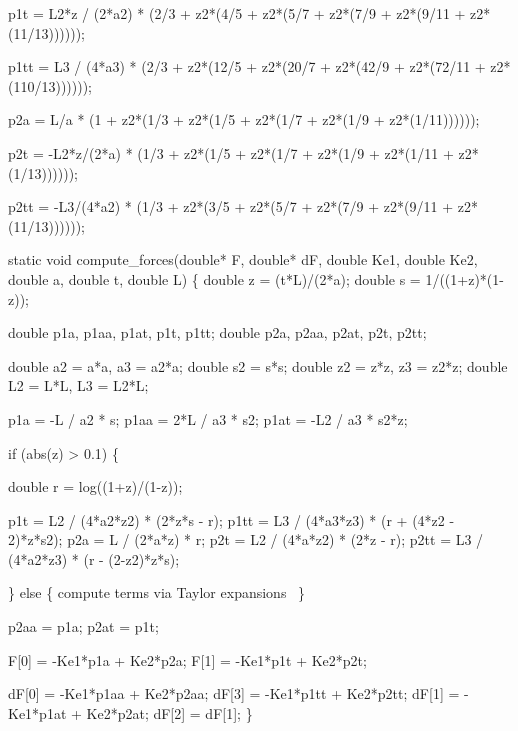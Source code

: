 p1t = L2*z / (2*a2) *
(2/3 + z2*(4/5 + z2*(5/7 + z2*(7/9 + z2*(9/11 + z2*(11/13))))));

p1tt = L3 / (4*a3) *
(2/3 + z2*(12/5 + z2*(20/7 + z2*(42/9 + z2*(72/11 + z2*(110/13))))));

p2a = L/a *
(1 + z2*(1/3 + z2*(1/5 + z2*(1/7 + z2*(1/9 + z2*(1/11))))));

p2t = -L2*z/(2*a) * 
(1/3 + z2*(1/5 + z2*(1/7 + z2*(1/9 + z2*(1/11 + z2*(1/13))))));

p2tt = -L3/(4*a2) *
(1/3 + z2*(3/5 + z2*(5/7 + z2*(7/9 + z2*(9/11 + z2*(11/13))))));

\nwendcode{}\nwdocspar

\nwenddocs{}\endmoddef
static void compute_forces(double* F, double* dF,
                           double Ke1, double Ke2, 
                           double a, double t, double L)
\{
    double z = (t*L)/(2*a);
    double s = 1/((1+z)*(1-z));

    double p1a, p1aa, p1at, p1t, p1tt;
    double p2a, p2aa, p2at, p2t, p2tt;

    double a2 = a*a, a3 = a2*a;
    double s2 = s*s;
    double z2 = z*z, z3 = z2*z;
    double L2 = L*L, L3 = L2*L;

    p1a  =   -L  / a2 * s;
    p1aa =  2*L  / a3 * s2;
    p1at =   -L2 / a3 * s2*z;

    if (abs(z) > 0.1) \{

        double r = log((1+z)/(1-z));

        p1t  =  L2 / (4*a2*z2) * (2*z*s - r);
        p1tt =  L3 / (4*a3*z3) * (r + (4*z2 - 2)*z*s2);
        p2a  =   L / (2*a*z) * r;
        p2t  =  L2 / (4*a*z2) * (2*z - r);
        p2tt =  L3 / (4*a2*z3) * (r - (2-z2)*z*s);

    \} else \{
        \LA{}compute terms via Taylor expansions~{\nwtagstyle{}}\RA{}
    \}

    p2aa = p1a;
    p2at = p1t;

    F[0]  = -Ke1*p1a  + Ke2*p2a;
    F[1]  = -Ke1*p1t  + Ke2*p2t;

    dF[0] = -Ke1*p1aa + Ke2*p2aa;
    dF[3] = -Ke1*p1tt + Ke2*p2tt;
    dF[1] = -Ke1*p1at + Ke2*p2at;
    dF[2] = dF[1];
\}

\nwendcode{}\nwdocspar


